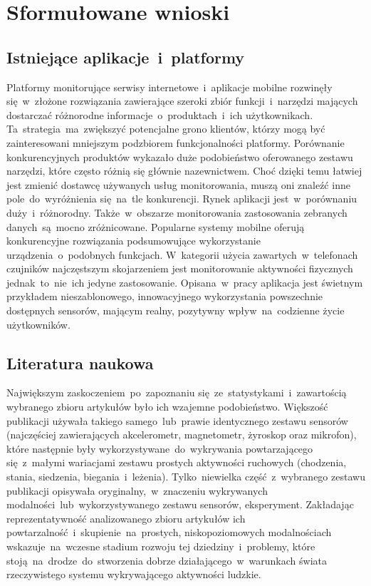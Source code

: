 \section{Sformułowane wnioski}

\subsection{Istniejące aplikacje~i~platformy}
Platformy monitorujące serwisy internetowe~i~aplikacje mobilne rozwinęły się~w~złożone rozwiązania zawierające szeroki zbiór funkcji~i~narzędzi mających dostarczać różnorodne informacje~o~produktach~i~ich użytkownikach. Ta~strategia~ma~zwiększyć potencjalne grono klientów, którzy mogą być zainteresowani mniejszym podzbiorem funkcjonalności platformy. Porównanie konkurencyjnych produktów wykazało duże podobieństwo oferowanego zestawu narzędzi, które często różnią się głównie nazewnictwem. Choć dzięki temu łatwiej jest zmienić dostawcę używanych usług monitorowania, muszą oni znaleźć inne pole~do~wyróżnienia się~na~tle konkurencji. Rynek aplikacji jest~w~porównaniu duży~i~różnorodny. Także~w~obszarze monitorowania zastosowania zebranych danych~są~mocno zróżnicowane. Popularne systemy mobilne oferują konkurencyjne rozwiązania podsumowujące wykorzystanie urządzenia~o~podobnych funkcjach. W~kategorii użycia zawartych~w~telefonach czujników najczęstszym skojarzeniem jest monitorowanie aktywności fizycznych jednak~to~nie~ich jedyne zastosowanie. Opisana~w~pracy aplikacja  jest świetnym przykładem nieszablonowego, innowacyjnego wykorzystania powszechnie dostępnych sensorów, mającym realny, pozytywny wpływ~na~codzienne życie użytkowników.

\subsection{Literatura naukowa}
Największym zaskoczeniem~po~zapoznaniu się~ze~statystykami~i~zawartością wybranego zbioru artykułów było ich wzajemne podobieństwo. Większość publikacji używała takiego samego~lub~prawie identycznego zestawu sensorów (najczęściej zawierających akcelerometr, magnetometr, żyroskop oraz mikrofon), które następnie były wykorzystywane~do~wykrywania powtarzającego się~z~małymi wariacjami zestawu prostych aktywności ruchowych (chodzenia, stania, siedzenia, biegania~i~leżenia). Tylko~niewielka część~z~wybranego zestawu publikacji opisywała oryginalny,~w~znaczeniu wykrywanych modalności~lub~wykorzystywanego zestawu sensorów, eksperyment. Zakładając reprezentatywność analizowanego zbioru artykułów ich powtarzalność~i~skupienie~na~prostych, niskopoziomowych modalnościach wskazuje~na~wczesne stadium rozwoju tej dziedziny~i~problemy, które stoją~na~drodze~do~stworzenia dobrze działającego~w~warunkach świata rzeczywistego systemu wykrywającego aktywności ludzkie.

